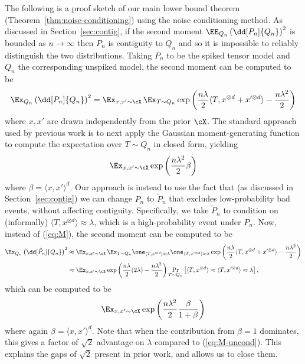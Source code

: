 \documentclass{article}
\begin{document}
The following is a proof sketch of our main lower bound theorem (Theorem~\ref{thm:noise-conditioning}) using the noise conditioning method. As discussed in Section~\ref{sec:contig}, if the second moment $\EE_{Q_n} \left(\dd[P_n]{Q_n}\right)^2$ is bounded as $n \to \infty$ then $P_n$ is contiguity to $Q_n$ and so it is impossible to reliably distinguish the two distributions. Taking $P_n$ to be the spiked tensor model and $Q_n$ the corresponding unspiked model, the second moment can be computed to be
\begin{equation}
\label{eq:M}
\Ex_{Q_n}\left(\dd[P_n]{Q_n}\right)^2 = \Ex_{x,x' \sim \cX} \,\Ex_{T \sim Q_n} \exp\left(\frac{n\lambda}{2} \langle T, x^{\otimes d} + x'^{\otimes d} \rangle - \frac{n\lambda^2}{2} \right)
\end{equation}
where $x,x'$ are drawn independently from the prior $\cX$. The standard approach used by previous work is to next apply the Gaussian moment-generating function to compute the expectation over $T \sim Q_n$ in closed form, yielding
\begin{equation}
\label{eq:M-uncond}
\Ex_{x,x' \sim \cX} \exp\left(\frac{n\lambda^2}{2} \beta\right)
\end{equation}
where $\beta = \langle x,x' \rangle^d$. Our approach is instead to use the fact that (as discussed in Section~\ref{sec:contig}) we can change $P_n$ to $\tilde P_n$ that excludes low-probability bad events, without affecting contiguity. Specifically, we take $\tilde P_n$ to condition on (informally) $\langle T, x^{\otimes d} \rangle \approx \lambda$, which is a high-probability event under $P_n$. Now, instead of (\ref{eq:M}), the second moment can be computed to be
\begin{align*}
\Ex_{Q_n}\left(\dd[\tilde P_n]{Q_n}\right)^2 &\approx \Ex_{x,x' \sim \cX} \,\Ex_{T \sim Q_n} \one_{\langle T,x^{\otimes d} \rangle \approx \lambda}\one_{\langle T,x'^{\otimes d} \rangle \approx \lambda}\exp\left(\frac{n\lambda}{2} \langle T, x^{\otimes d} + x'^{\otimes d} \rangle - \frac{n\lambda^2}{2} \right) \\
&\approx \Ex_{x,x' \sim \cX} \exp\left(\frac{n\lambda}{2} (2\lambda) - \frac{n\lambda^2}{2} \right) \Pr_{T \sim Q_n}\left[{\langle T,x^{\otimes d} \rangle \approx \langle T,x'^{\otimes d} \rangle \approx \lambda}\right], \\
\end{align*}
which can be computed to be
\begin{equation}
\label{eq:M-cond}
\Ex_{x,x' \sim \cX} \exp\left(\frac{n\lambda^2}{2} \frac{\beta}{1+\beta}\right)
\end{equation}
where again $\beta = \langle x,x' \rangle^d$. Note that when the contribution from $\beta = 1$ dominates, this gives a factor of $\sqrt{2}$ advantage on $\lambda$ compared to (\ref{eq:M-uncond}). This explains the gaps of $\sqrt{2}$ present in prior work, and allows us to close them.
\end{document}
